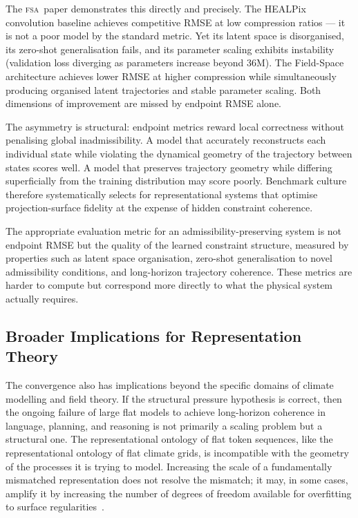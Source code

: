 \documentclass[11pt,a4paper]{article}
\theoremstyle{plain}
\theoremstyle{definition}
\theoremstyle{remark}
\newcommand{\FSA}{\textup{\textsc{fsa}}}
\begin{document}
The \FSA\ paper demonstrates this directly and precisely. The HEALPix
convolution baseline achieves competitive RMSE at low compression ratios
--- it is not a poor model by the standard metric. Yet its latent space is
disorganised, its zero-shot generalisation fails, and its parameter scaling
exhibits instability (validation loss diverging as parameters increase beyond
36M). The Field-Space architecture achieves lower RMSE at higher compression
while simultaneously producing organised latent trajectories and stable
parameter scaling. Both dimensions of improvement are missed by endpoint
RMSE alone.

The asymmetry is structural: endpoint metrics reward local correctness
without penalising global inadmissibility. A model that accurately
reconstructs each individual state while violating the dynamical geometry
of the trajectory between states scores well. A model that preserves
trajectory geometry while differing superficially from the training
distribution may score poorly. Benchmark culture therefore systematically
selects for representational systems that optimise projection-surface
fidelity at the expense of hidden constraint coherence.

The appropriate evaluation metric for an admissibility-preserving system is
not endpoint RMSE but the quality of the learned constraint structure,
measured by properties such as latent space organisation, zero-shot
generalisation to novel admissibility conditions, and long-horizon
trajectory coherence. These metrics are harder to compute but correspond
more directly to what the physical system actually requires.

\subsection{Broader Implications for Representation Theory}

The convergence also has implications beyond the specific domains of climate
modelling and field theory. If the structural pressure hypothesis is correct,
then the ongoing failure of large flat models to achieve long-horizon
coherence in language, planning, and reasoning is not primarily a scaling
problem but a structural one. The representational ontology of flat token
sequences, like the representational ontology of flat climate grids, is
incompatible with the geometry of the processes it is trying to model.
Increasing the scale of a fundamentally mismatched representation does not
resolve the mismatch; it may, in some cases, amplify it by increasing the
number of degrees of freedom available for overfitting to surface
regularities~\cite{Yan2024,Hunt2025}.
\end{document}
